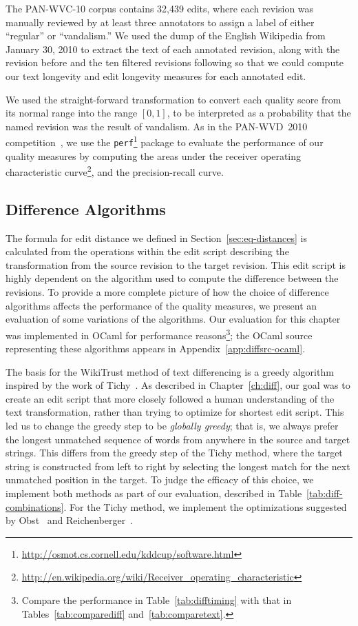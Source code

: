 The PAN-WVC-10 corpus contains 32,439 edits, where each revision was
manually reviewed by at least three annotators to assign a label
of either ``regular'' or ``vandalism.''
We used the dump of the English Wikipedia from January 30, 2010
to extract the text of each annotated revision, along with the revision
before and the ten filtered revisions following so that we could compute
our text longevity and edit longevity measures for each annotated edit.

We used the straight-forward transformation to convert
each quality score from its normal range into the range
$[0,1]$, to be interpreted as a probability that the named
revision was the result of vandalism.
As in the PAN-WVD~2010 competition~\cite{Potthast2010b}, we use the
\texttt{perf}\footnote{\url{http://osmot.cs.cornell.edu/kddcup/software.html}}
package to evaluate the performance of our quality measures
by computing the areas under the receiver operating characteristic
curve\footnote{\url{http://en.wikipedia.org/wiki/Receiver_operating_characteristic}},
and the precision-recall curve.

\subsection{Difference Algorithms}

The formula for edit distance we defined in
Section~\ref{sec:eq-distances} is calculated
from the operations within the edit script describing the transformation
from the source revision to the target revision.
This edit script is highly dependent on the algorithm used to
compute the difference between the revisions.
To provide a more complete picture of how the choice of difference
algorithms affects the performance of the quality measures,
we present an evaluation of some variations of the algorithms.
Our evaluation for this chapter was implemented in OCaml for performance
reasons\footnote{Compare the performance in Table~\ref{tab:difftiming}
with that in Tables~\ref{tab:comparediff} and~\ref{tab:comparetext}.};
the OCaml source representing these algorithms appears
in Appendix~\ref{app:diffsrc-ocaml}.

The basis for the WikiTrust method of text differencing is a greedy
algorithm inspired by the work of Tichy~\cite{Tichy1984}.
As described in Chapter~\ref{ch:diff}, our goal was to create an edit
script that more closely followed a human understanding of the text
transformation, rather than trying to optimize for shortest edit script.
This led us to change the greedy step to be \textit{globally greedy};
that is, we always prefer the longest unmatched sequence of words
from anywhere in the source and target strings.
This differs from the greedy step of the Tichy method, where the
target string is constructed from left to right by selecting the longest
match for the next unmatched position in the target.
To judge the efficacy of this choice, we implement both methods as part
of our evaluation, described in Table~\ref{tab:diff-combinations}.
For the Tichy method, we implement the optimizations suggested by
Obst~\cite{Obst1987} and Reichenberger~\cite{Reichenberger1991}.

